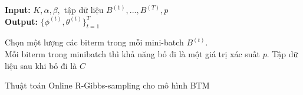 \documentclass[pdf]{beamer}
\begin{document}
%


\begin{frame}
\begin{algorithm}[H]
	\textbf{Input: }  $K, \alpha , \beta, $ tập dữ liệu $B^{(1)}, ..., B^{(T)}, p$  \\
	\textbf{Output:} $\{\phi^{(t)}, \theta^{(t)} \}_{t=1}^T$
	\begin{algorithmic}[1]
		\STATE Chọn một lượng các biterm trong mỗi mini-batch $B^{(t)}$. \\
		Mỗi biterm trong minibatch thì khả năng bỏ đi là một giá trị xác suất $p$. 
		Tập dữ liệu sau khi bỏ đi là $C$
		\ENDFOR
		\ENDFOR
		\ENDFOR
	\end{algorithmic}
	\caption{Thuật toán Online R-Gibbs-sampling cho mô hình BTM }
	\label{alg:seq}
\end{algorithm}
\end{frame}
\end{document}
